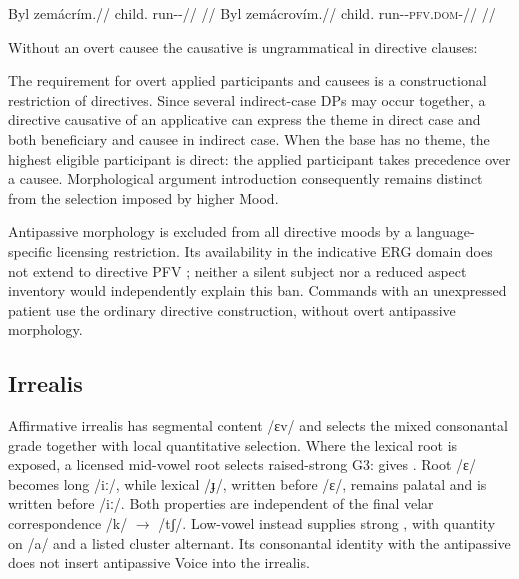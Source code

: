\pex\label{ex:val-directive-caus-intr}
\a
\begingl
\gla Byl zemácrím.//
\glb child.\Dir{} run-\Caus{}-\Imp{}//
\glft {} //
\endgl
\a
\begingl
\gla Byl zemácrovím.//
\glb child.\Dir{} run-\Caus{}-\textsc{pfv.dom}-\Imp{}//
\glft {} //
\endgl
\xe

\noindent Without an overt causee the causative is ungrammatical in directive clauses:

\pex
{}  
\xe

The requirement for overt applied participants and causees is a constructional
restriction of directives. Since several indirect-case DPs may occur together,
a directive causative of an applicative can express the theme in direct case
and both beneficiary and causee in indirect case. When the base has no theme,
the highest eligible participant is direct: the applied participant takes
precedence over a causee. Morphological argument introduction consequently
remains distinct from the selection imposed by higher Mood.

Antipassive morphology is excluded from all directive moods by a
language-specific licensing restriction. Its availability in the indicative
ERG domain does not extend to directive PFV ; neither a silent
subject nor a reduced aspect inventory would independently explain this ban.
Commands with an unexpressed patient use the ordinary directive construction,
without overt antipassive morphology.

\subsection{Irrealis}

Affirmative irrealis  has segmental content /ɛv/ and selects
the mixed consonantal grade together with local quantitative selection. Where the lexical root is exposed, a
licensed mid-vowel root selects raised-strong G3: 
 gives . Root /ɛ/ becomes long /iː/, while
lexical /ɟ/, written  before /ɛ/, remains palatal and is written
 before /iː/. Both properties are independent of the final velar
correspondence /k/ $\rightarrow$ /tʃ/.
Low-vowel  instead supplies strong ,
with quantity on /a/ and a listed cluster alternant. Its consonantal
identity with the antipassive does not insert antipassive Voice into
the irrealis.

